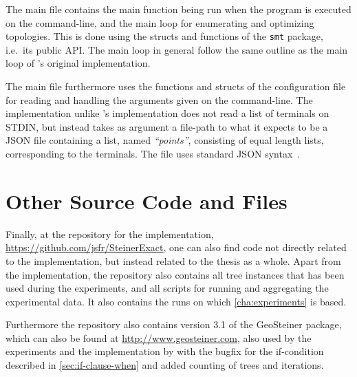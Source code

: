 The main file contains the main function being run when the program is executed
on the command-line, and the main loop for enumerating and optimizing
topologies. This is done using the structs and functions of the \texttt{smt}
package, i.e.\ its public API. The main loop in general follow the same outline
as the main loop of \citeauthor{smith1992}'s original implementation.

The main file furthermore uses the functions and structs of the configuration
file for reading and handling the arguments given on the command-line. The
implementation unlike \citeauthor{smith1992}'s implementation does not read a
list of terminals on STDIN, but instead takes as argument a file-path to what it
expects to be a JSON file containing a list, named \textit{``points''},
consisting of equal length lists, corresponding to the terminals. The file uses
standard JSON syntax~\cite{ecma404}.

\section{Other Source Code and Files}
\label{sec:other-source-code}

Finally, at the repository for the implementation,
\url{https://github.com/jsfr/SteinerExact}, one can also find code not directly
related to the implementation, but instead related to the thesis as a
whole. Apart from the implementation, the repository also contains all tree
instances that has been used during the experiments, and all scripts for running
and aggregating the experimental data. It also contains the runs on which
\cref{cha:experiments} is based.

Furthermore the repository also contains version 3.1 of the GeoSteiner package,
which can also be found at \url{http://www.geosteiner.com}, also used by the
experiments and the implementation by \textcite{smith1992} with the bugfix for
the if-condition described in \cref{sec:if-clause-when} and added counting of
trees and iterations.

